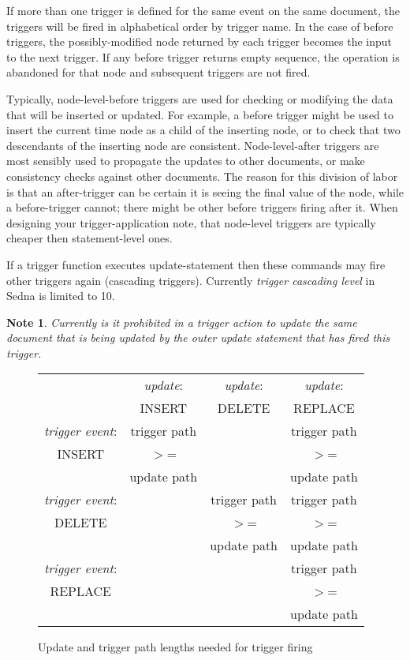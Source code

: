 \documentclass[a4paper,12pt]{article}
\newtheorem{note}{Note}    %
\begin{document}
If more than one trigger is defined for the same event on the same document, the
triggers will be fired in alphabetical order by trigger name. In the case of
before triggers, the possibly-modified node returned by each trigger becomes the
input to the next trigger. If any before trigger returns empty sequence, the
operation is abandoned for that node and subsequent triggers are not fired.

Typically, node-level-before triggers are used for checking or modifying the
data that will be inserted or updated. For example, a before trigger might be
used to insert the current time node as a child of the inserting node, or to
check that two descendants of the inserting node are consistent.
Node-level-after triggers are most sensibly used to propagate the updates to
other documents, or make consistency checks against other documents. The reason
for this division of labor is that an after-trigger can be certain it is seeing
the final value of the node, while a before-trigger cannot; there might be other
before triggers firing after it. When designing your trigger-application note,
that node-level triggers are typically cheaper then statement-level ones.

If a trigger function executes update-statement then these commands may fire
other triggers again (cascading triggers). Currently \emph{trigger cascading
level} in Sedna is limited to 10.

\begin{note}
Currently is it prohibited in a trigger action to update the same document that
is being updated by the outer update statement that has fired this trigger.
\end{note}

\begin{figure}[h]
\begin{center}
{\footnotesize\begin{tabular}{|c||c|c|c|}
\hline
   & \emph{update}:  & \emph{update}:  & \emph{update}:  \\
   & INSERT   & DELETE   & REPLACE  \\
\hline
\hline
\emph{trigger event}:  & trigger path &   &  trigger path   \\
     INSERT            &    $>$=      &   &      $>$=       \\
                       & update path  &   &  update path    \\
\hline
\emph{trigger event}:  &  & trigger path &  trigger path \\
      DELETE           &  &     $>$=     &      $>$=     \\
                       &  & update path  &   update path \\
\hline
\emph{trigger event}: &  &   &  trigger path \\
      REPLACE         &  &   &      $>$=     \\
                      &  &   &  update path  \\
\hline

\end{tabular}}
\caption{\label{triggertab} Update and trigger path lengths needed for trigger
firing}
\end{center}
\end{figure}
\end{document}
